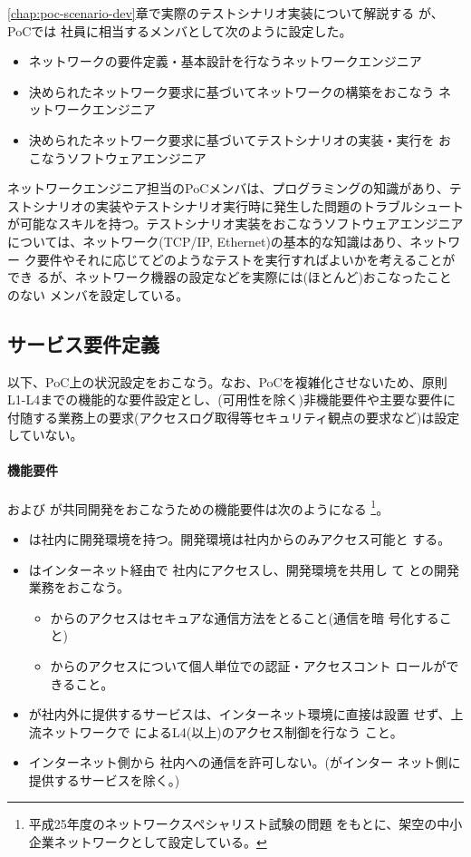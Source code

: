 \ref{chap:poc-scenario-dev}章で実際のテストシナリオ実装について解説する
が、PoCでは \tj 社員に相当するメンバとして次のように設定した。
\begin{itemize}
 \item ネットワークの要件定義・基本設計を行なうネットワークエンジニア
 \item 決められたネットワーク要求に基づいてネットワークの構築をおこなう
       ネットワークエンジニア
 \item 決められたネットワーク要求に基づいてテストシナリオの実装・実行を
       おこなうソフトウェアエンジニア
\end{itemize}

ネットワークエンジニア担当のPoCメンバは、プログラミングの知識があり、テ
ストシナリオの実装やテストシナリオ実行時に発生した問題のトラブルシュート
が可能なスキルを持つ。テストシナリオ実装をおこなうソフトウェアエンジニア
については、ネットワーク(TCP/IP, Ethernet)の基本的な知識はあり、ネットワー
ク要件やそれに応じてどのようなテストを実行すればよいかを考えることができ
るが、ネットワーク機器の設定などを実際には(ほとんど)おこなったことのない
メンバを設定している。

  \subsection{サービス要件定義}

以下、PoC上の状況設定をおこなう。なお、PoCを複雑化させないため、原則
L1-L4までの機能的な要件設定とし、(可用性を除く)非機能要件や主要な要件に
付随する業務上の要求(アクセスログ取得等セキュリティ観点の要求など)は設定
していない。

    \paragraph{機能要件}
\yo および \tj が共同開発をおこなうための機能要件は次のようになる
\footnote{平成25年度のネットワークスペシャリスト試験の問題\cite{h25nwsp}
をもとに、架空の中小企業ネットワークとして設定している。}。
\begin{itemize}
 \item \yo は社内に開発環境を持つ。開発環境は社内からのみアクセス可能と
       する。
 \item \tj はインターネット経由で \yo 社内にアクセスし、開発環境を共用し
       て \yo との開発業務をおこなう。
       \begin{itemize}
        \item \tj からのアクセスはセキュアな通信方法をとること(通信を暗
              号化すること)
        \item \tj からのアクセスについて個人単位での認証・アクセスコント
              ロールができること。
       \end{itemize}
 \item \yo が社内外に提供するサービスは、インターネット環境に直接は設置
       せず、上流ネットワークで \yo によるL4(以上)のアクセス制御を行なう
       こと。
 \item インターネット側から \yo 社内への通信を許可しない。(\yo がインター
       ネット側に提供するサービスを除く。)
\end{itemize}

